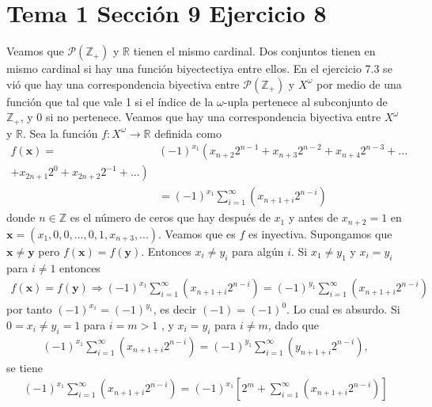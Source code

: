 \documentclass{article}
\newcommand{\vect}[1]{\boldsymbol{#1}}
\begin{document}
\section{Tema 1 Sección 9 Ejercicio 8}
Veamos que $\mathcal{P}(\mathbb{Z}_{+})$ y $\mathbb{R}$ tienen el mismo cardinal. Dos conjuntos tienen en mismo cardinal si hay una función biyectectiya entre ellos. En el ejercicio 7.3 se vió que hay una correspondencia biyectiva entre $\mathcal{P}(\mathbb{Z}_{+})$ y $X^{\omega}$ por medio de una función que tal que vale 1 si el índice de la $\omega$-upla pertenece al subconjunto de $\mathbb{Z}_{+}$, y 0 si no pertenece. Veamos que hay una correspondencia biyectiva entre $X^{\omega}$ y $\mathbb{R}$. Sea la función $f:X^{\omega}\rightarrow \mathbb{R}$ definida como 
\begin{eqnarray}
f(\vect{x})=
&(-1)^{x_1}\left(x_{n+2}2^{n-1}+x_{n+3}2^{n-2}+x_{n+4}2^{n-3}+...\right.\nonumber\\
\left.+x_{2n+1}2^0+x_{2n+2}2^{-1}+...\right)&\nonumber\\
&=(-1)^{x_1}\sum_{i=1}^{\infty}\left(x_{n+1+i}2^{n-i}\right)&\nonumber
\end{eqnarray}
donde $n\in \mathbb{Z}$ es el número de ceros que hay después de $x_1$ y antes de $x_{n+2}=1$ en $\vect{x}=(x_1,0,0,...,0,1,x_{n+3},...)$.
Veamos que es $f$ es inyectiva. Supongamos que $\vect{x} \neq \vect{y}$ pero $f(\vect{x})=f(\vect{y})$. Entonces $x_i\neq y_i$ para algún $i$. Si $x_1\neq y_1$ y $x_i=y_i$ para $i\neq1$ entonces 
\begin{eqnarray}
f(\vect{x})=f(\vect{y})\Rightarrow (-1)^{x_1}\sum_{i=1}^{\infty}\left(x_{n+1+i}2^{n-i}\right)=(-1)^{y_1}\sum_{i=1}^{\infty}\left(x_{n+1+i}2^{n-i}\right)\nonumber
\end{eqnarray}
por tanto
$(-1)^{x_1}=(-1)^{y_1}$, es decir $(-1)=(-1)^{0}$. Lo cual es absurdo. Si $0=x_i\neq y_i=1$ para $i=m>1$ , y $x_i= y_i$ para $i\neq m $, dado que \begin{eqnarray}(-1)^{x_1}\sum_{i=1}^{\infty}\left(x_{n+1+i}2^{n-i}\right)=(-1)^{y_1}\sum_{i=1}^{\infty}\left(y_{n+1+i}2^{n-i}\right),\nonumber
\end{eqnarray}
se tiene
\begin{eqnarray}(-1)^{x_1}\sum_{i=1}^{\infty}\left(x_{n+1+i}2^{n-i}\right)=(-1)^{x_1}\left[2^m+\sum_{i=1}^{\infty}\left(x_{n+1+i}2^{n-i}\right)\right]\nonumber
\end{eqnarray}
\end{document}
